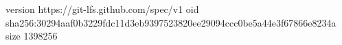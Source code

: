 version https://git-lfs.github.com/spec/v1
oid sha256:30294aaf0b3229fdc11d3eb9397523820ee29094ccc0be5a44e3f67866e8234a
size 1398256

